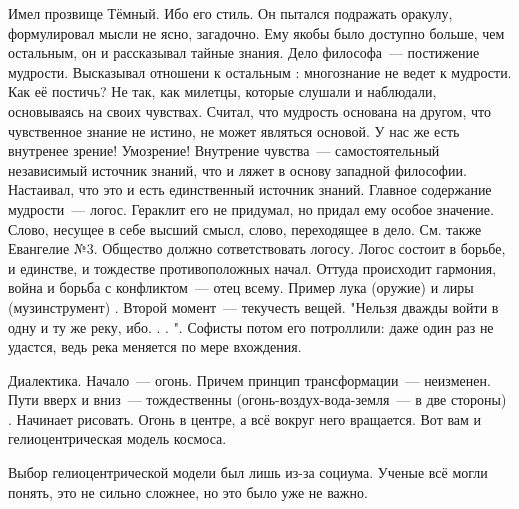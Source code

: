 Имел прозвище Тёмный. Ибо его стиль. Он пытался подражать оракулу, формулировал мысли не ясно, загадочно. 
Ему якобы было доступно больше, чем остальным, он и рассказывал тайные знания. 
Дело философа~--- постижение мудрости. Высказывал отношени к остальным : многознание не ведет к мудрости. Как её постичь? 
Не так, как милетцы, которые слушали и наблюдали, основываясь на своих чувствах. Считал, что мудрость основана на другом, что чувственное знание не истино, не может являться основой. 
У нас же есть внутренее зрение! Умозрение! Внутрение чувства~--- самостоятельный независимый источник знаний, что и ляжет в основу западной философии. Настаивал, что это и есть единственный источник знаний. 
Главное содержание мудрости~--- логос. Гераклит его не придумал, но придал ему особое значение. Слово, несущее в себе высший смысл, слово, переходящее в дело. См. также Евангелие №3. 
Общество должно сответствовать логосу. Логос состоит в борьбе, и единстве, и тождестве противоположных начал. Оттуда происходит гармония, война и борьба с конфликтом~--- отец всему. 
Пример лука (оружие) и лиры (музинструмент) . Второй момент~--- текучесть вещей. "Нельзя дважды войти в одну и ту же реку, ибо. . . ". Софисты потом его потроллили: даже один раз не удастся, ведь река меняется по мере вхождения. 

Диалектика. 
Начало~--- огонь. Причем принцип трансформации~--- неизменен. Пути вверх и вниз~--- тождественны (огонь-воздух-вода-земля~--- в две стороны) . Начинает рисовать. Огонь в центре, а всё вокруг него вращается. Вот вам и гелиоцентрическая модель космоса. 

Выбор гелиоцентрической модели был лишь из-за социума. Ученые всё могли понять, это не сильно сложнее, но это было уже не важно. 
